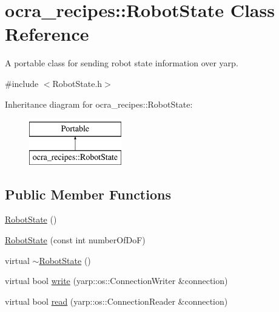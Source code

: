 \hypertarget{classocra__recipes_1_1RobotState}{}\section{ocra\+\_\+recipes\+:\+:Robot\+State Class Reference}
\label{classocra__recipes_1_1RobotState}


A portable class for sending robot state information over yarp.  




{\ttfamily \#include $<$Robot\+State.\+h$>$}

Inheritance diagram for ocra\+\_\+recipes\+:\+:Robot\+State\+:\begin{figure}[H]
\begin{center}
\leavevmode
\includegraphics[height=2.000000cm]{d5/dd0/classocra__recipes_1_1RobotState}
\end{center}
\end{figure}
\subsection*{Public Member Functions}
\begin{DoxyCompactItemize}
\item 
\hyperlink{classocra__recipes_1_1RobotState_ad10e75019e308bb0be22aa545eab0c44}{Robot\+State} ()
\item 
\hyperlink{classocra__recipes_1_1RobotState_ae6462774d46dadc364bc936f61bde768}{Robot\+State} (const int number\+Of\+DoF)
\item 
virtual \hyperlink{classocra__recipes_1_1RobotState_a86cf2dc3aef7d924f89d5b3e5467ea8a}{$\sim$\+Robot\+State} ()
\item 
virtual bool \hyperlink{classocra__recipes_1_1RobotState_aa99fa493c3fe185f2018059f35e56164}{write} (yarp\+::os\+::\+Connection\+Writer \&connection)
\item 
virtual bool \hyperlink{classocra__recipes_1_1RobotState_a98e0e09ec0829542fab9037f6c8f6301}{read} (yarp\+::os\+::\+Connection\+Reader \&connection)
\end{DoxyCompactItemize}
